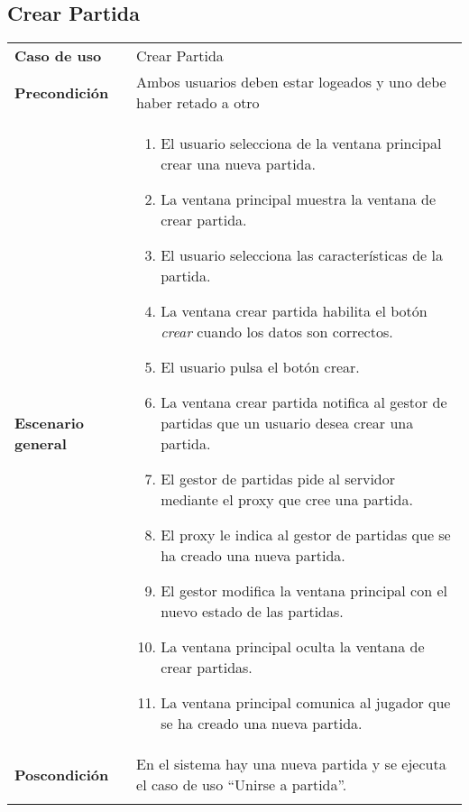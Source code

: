 
\subsection{Crear Partida}
{\footnotesize
\begin{tabularx}{0.95\textwidth}{p{}|X}

\textbf{Caso de uso} & Crear Partida \\

\textbf{Precondición} & Ambos usuarios deben estar logeados y uno debe haber retado a otro \\

\textbf{Escenario general} & \begin{enumerate}
\item El usuario selecciona de la ventana principal crear una nueva partida.
\item La ventana principal muestra la ventana de crear partida.
\item El usuario selecciona las características de la partida.
\item La ventana crear partida habilita el botón \emph{crear} cuando los datos
son correctos.
\item El usuario pulsa el botón crear.
\item La ventana crear partida notifica al gestor de partidas que un usuario
desea crear una partida.
\item El gestor de partidas pide al servidor mediante el proxy que cree una
partida.
\item El proxy le indica al gestor de partidas que se ha creado una nueva
partida.
\item El gestor modifica la ventana principal con el nuevo estado de las
partidas.
\item La ventana principal oculta la ventana de crear partidas.
\item La ventana principal comunica al jugador que se ha creado una nueva
partida.
\end{enumerate} \\

\textbf{Poscondición} & En el sistema hay una nueva partida y se ejecuta el caso
 de uso ``Unirse a partida''.\\ \\


\end{tabularx}}
